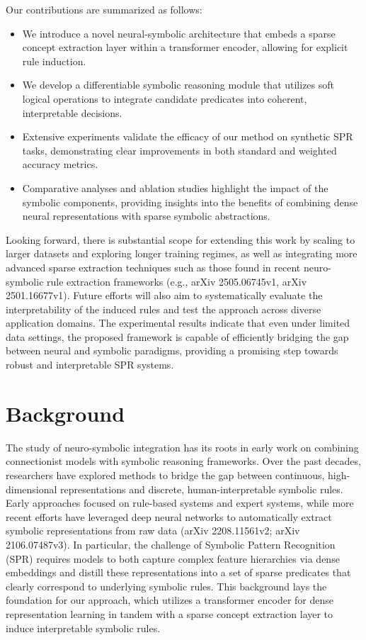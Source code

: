 \documentclass{article}
\begin{document}
Our contributions are summarized as follows:
\begin{itemize}
    \item We introduce a novel neural-symbolic architecture that embeds a sparse concept extraction layer within a transformer encoder, allowing for explicit rule induction.
    \item We develop a differentiable symbolic reasoning module that utilizes soft logical operations to integrate candidate predicates into coherent, interpretable decisions.
    \item Extensive experiments validate the efficacy of our method on synthetic SPR tasks, demonstrating clear improvements in both standard and weighted accuracy metrics.
    \item Comparative analyses and ablation studies highlight the impact of the symbolic components, providing insights into the benefits of combining dense neural representations with sparse symbolic abstractions.
\end{itemize}

Looking forward, there is substantial scope for extending this work by scaling to larger datasets and exploring longer training regimes, as well as integrating more advanced sparse extraction techniques such as those found in recent neuro-symbolic rule extraction frameworks (e.g., arXiv 2505.06745v1, arXiv 2501.16677v1). Future efforts will also aim to systematically evaluate the interpretability of the induced rules and test the approach across diverse application domains. The experimental results indicate that even under limited data settings, the proposed framework is capable of efficiently bridging the gap between neural and symbolic paradigms, providing a promising step towards robust and interpretable SPR systems.

\section{Background}
The study of neuro-symbolic integration has its roots in early work on combining connectionist models with symbolic reasoning frameworks. Over the past decades, researchers have explored methods to bridge the gap between continuous, high-dimensional representations and discrete, human-interpretable symbolic rules. Early approaches focused on rule-based systems and expert systems, while more recent efforts have leveraged deep neural networks to automatically extract symbolic representations from raw data (arXiv 2208.11561v2; arXiv 2106.07487v3). In particular, the challenge of Symbolic Pattern Recognition (SPR) requires models to both capture complex feature hierarchies via dense embeddings and distill these representations into a set of sparse predicates that clearly correspond to underlying symbolic rules. This background lays the foundation for our approach, which utilizes a transformer encoder for dense representation learning in tandem with a sparse concept extraction layer to induce interpretable symbolic rules.
\end{document}
